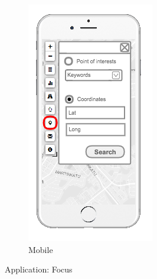 \begin{figure}[ht]
\begin{subfigure}[b]{0.2\textwidth}
    \includegraphics[width=\textwidth]
      {img/c02-application/png/mobile-basemap-focus.png}
    \caption{Mobile}
  \end{subfigure}
  \caption{Application: Focus}
\end{figure}


